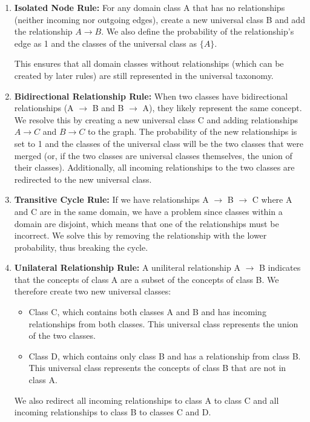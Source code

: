 \begin{enumerate}
    \item \textbf{Isolated Node Rule:} For any domain class A that has no relationships
          (neither incoming nor outgoing edges), create a new universal class B
          and add the relationship $A \rightarrow B$.
          We also define the probability of the relationship's edge as 1 and
          the classes of the universal class as $\{A\}$.

          This ensures that all domain classes without relationships (which can be created by later rules)
          are still represented in the universal taxonomy.

    \item \textbf{Bidirectional Relationship Rule:} When two classes have bidirectional relationships
          (A $\rightarrow$ B and B $\rightarrow$ A), they likely represent the same concept.
          We resolve this by creating a new universal class C and adding relationships
          $A \rightarrow C$ and $B \rightarrow C$ to the graph.
          The probability of the new relationships is set to 1 and the classes of the universal class
          will be the two classes that were merged (or, if the two classes are universal classes themselves,
          the union of their classes).
          Additionally, all incoming relationships to the two classes are redirected to the new universal class.

    \item \textbf{Transitive Cycle Rule:} If we have relationships A $\rightarrow$ B $\rightarrow$ C
          where A and C are in the same domain, we have a problem since classes within a domain
          are disjoint, which means that one of the relationships must be incorrect.
          We solve this by removing the relationship with the lower probability,
          thus breaking the cycle.

    \item \textbf{Unilateral Relationship Rule:} A uniliteral relationship
          A $\rightarrow$ B indicates that the concepts of class A are a subset of the concepts of class B.
          We therefore create two new universal classes:
          \begin{itemize}
              \item Class C, which contains both classes A and B and has incoming relationships
                    from both classes. This universal class represents the union of the two classes.
              \item Class D, which contains only class B and has a relationship from class B.
                    This universal class represents the concepts of class B that are not in class A.
          \end{itemize}
          We also redirect all incoming relationships to class A to class C and
          all incoming relationships to class B to classes C and D.
\end{enumerate}

